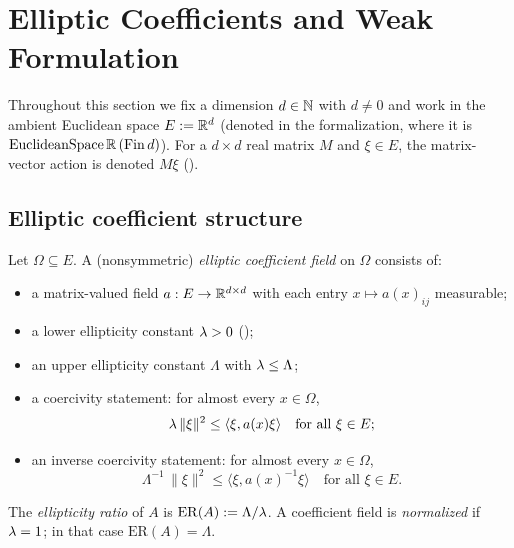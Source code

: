 \chapter{Elliptic Coefficients and Weak Formulation}\label{sec:weakform}


Throughout this section we fix a dimension $d \in \mathbb{N}$ with $d \neq 0$ and work in the ambient Euclidean space $E := \mathbb{R}^d$ (denoted  in the formalization, where it is $\mathrm{EuclideanSpace}\,\mathbb{R}\,(\mathrm{Fin}\,d)$). For a $d \times d$ real matrix $M$ and $\xi \in E$, the matrix-vector action is denoted $M\xi$ ().

\section{Elliptic coefficient structure}

\begin{definition}
\label{def:EllipticCoeff}
\leanok
Let $\Omega \subseteq E$. A (nonsymmetric) \emph{elliptic coefficient field} on $\Omega$ consists of:
\begin{itemize}
  \item a matrix-valued field $a : E \to \mathbb{R}^{d \times d}$ with each entry $x \mapsto a(x)_{ij}$ measurable;
  \item a lower ellipticity constant $\lambda > 0$ ();
  \item an upper ellipticity constant $\Lambda$ with $\lambda \leq \Lambda$;
  \item a coercivity statement: for almost every $x \in \Omega$,
  \begin{equation*}
    \lambda \,\|\xi\|^{2} \leq \langle \xi, a(x)\xi\rangle \quad \text{for all } \xi \in E;
  \end{equation*}
  \item an inverse coercivity statement: for almost every $x \in \Omega$,
  \begin{equation*}
    \Lambda^{-1}\,\|\xi\|^{2} \leq \langle \xi, a(x)^{-1}\xi\rangle \quad \text{for all } \xi \in E.
  \end{equation*}
\end{itemize}
\end{definition}

\begin{definition}
\label{def:ellipticityRatio}
\leanok
{}
The \emph{ellipticity ratio} of $A$ is $\mathrm{ER}(A) := \Lambda/\lambda$. A coefficient field is \emph{normalized} if $\lambda = 1$; in that case $\mathrm{ER}(A) = \Lambda$.
\end{definition}

